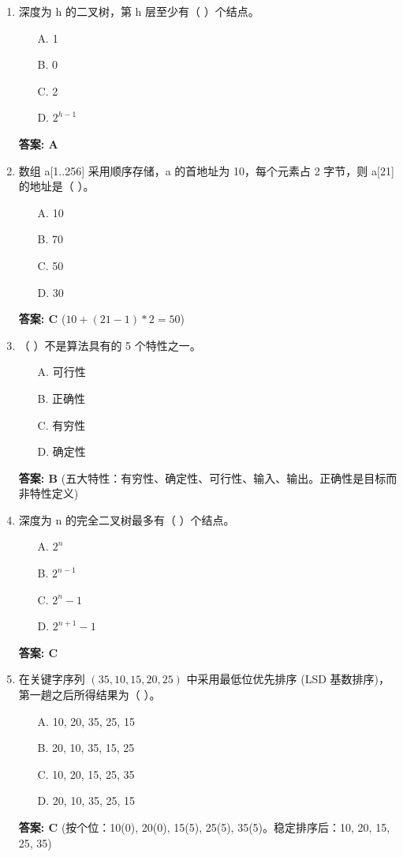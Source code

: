 \documentclass[12pt, a4paper]{article}
\begin{document}
\begin{enumerate}
    \item 深度为 h 的二叉树，第 h 层至少有（ ）个结点。
    \begin{enumerate}
        \item[A.] 1
        \item[B.] 0
        \item[C.] 2
        \item[D.] $2^{h-1}$
    \end{enumerate}
    \textbf{答案: A}

    \item 数组 a[1..256] 采用顺序存储，a 的首地址为 10，每个元素占 2 字节，则 a[21] 的地址是（ ）。
    \begin{enumerate}
        \item[A.] 10
        \item[B.] 70
        \item[C.] 50
        \item[D.] 30
    \end{enumerate}
    \textbf{答案: C} ($10 + (21-1)*2 = 50$)

    \item （ ）不是算法具有的 5 个特性之一。
    \begin{enumerate}
        \item[A.] 可行性
        \item[B.] 正确性
        \item[C.] 有穷性
        \item[D.] 确定性
    \end{enumerate}
    \textbf{答案: B} (五大特性：有穷性、确定性、可行性、输入、输出。正确性是目标而非特性定义)

    \item 深度为 n 的完全二叉树最多有（ ）个结点。
    \begin{enumerate}
        \item[A.] $2^n$
        \item[B.] $2^{n-1}$
        \item[C.] $2^n-1$
        \item[D.] $2^{n+1}-1$
    \end{enumerate}
    \textbf{答案: C}

    \item 在关键字序列 $(35, 10, 15, 20, 25)$ 中采用最低位优先排序 (LSD 基数排序)，第一趟之后所得结果为（ ）。
    \begin{enumerate}
        \item[A.] 10, 20, 35, 25, 15
        \item[B.] 20, 10, 35, 15, 25
        \item[C.] 10, 20, 15, 25, 35
        \item[D.] 20, 10, 35, 25, 15
    \end{enumerate}
    \textbf{答案: C} (按个位：10(0), 20(0), 15(5), 25(5), 35(5)。稳定排序后：10, 20, 15, 25, 35)


\end{enumerate}
\end{document}
